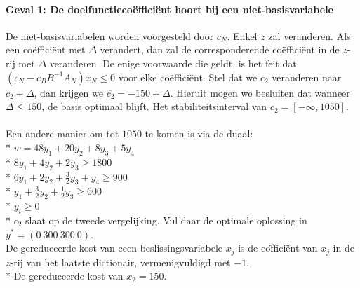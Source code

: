 \documentclass[10pt]{article}
\begin{document}
\paragraph{Geval 1: De doelfunctieco\"effici\"ent hoort bij een niet-basisvariabele}
De niet-basisvariabelen worden voorgesteld door $c_N$. Enkel $z$ zal veranderen. Als een co\"effici\"ent met $\Delta$ verandert, dan zal de corresponderende co\"effici\"ent in de $z$-rij met $\Delta$ veranderen. De enige voorwaarde die geldt, is het feit dat $(c_N-c_BB^{-1}A_N)x_N \le 0$ voor elke co\"effici\"ent. Stel dat we $c_2$ veranderen naar $c_2 + \Delta$, dan krijgen we $\overline{c_2} = -150 + \Delta$. Hieruit mogen we besluiten dat wanneer $\Delta \le 150$, de basis optimaal blijft. Het stabiliteitsinterval van $c_2 = [-\infty,1050]$.\\\\
Een andere manier om tot $1050$ te komen is via de duaal:\\*
$w = 48y_1 + 20y_2 + 8y_3 + 5y_4$\\*
$8y_1 + 4y_2 + 2y_3 \ge 1800$\\*
$6y_1 + 2y_2 + \frac{3}{2}y_3 + y_4 \ge 900$\\*
$y_1 + \frac{3}{2}y_2 + \frac{1}{2}y_3 \ge 600$\\*
$y_i \ge 0$\\*
$c_2$ slaat op de tweede vergelijking. Vul daar de optimale oplossing in $y^* = (0\ 300\ 300\ 0)$.\\
De gereduceerde kost van eeen beslissingsvariabele $x_j$ is de co\"ffici\"ent van $x_j$ in de $z$-rij van het laatste dictionair, vermenigvuldigd met $-1$.\\*
De gereduceerde kost van $x_2 = 150$.
\end{document}
